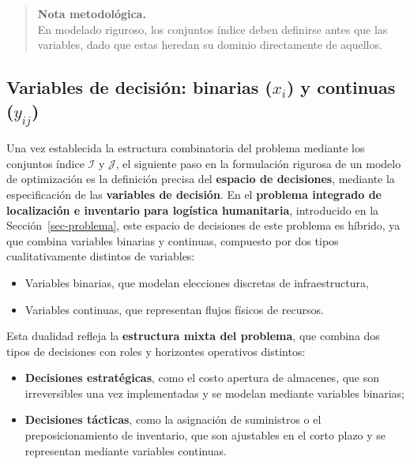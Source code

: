 \documentclass[
  spanish,
  us-letterpaper,
]{scrreprt}
\providecommand{\tightlist}{%
  \setlength{\itemsep}{0pt}\setlength{\parskip}{0pt}}
\numberwithin{equation}{section}
\begin{document}
\begin{quote}
\textbf{Nota metodológica.}\\
En modelado riguroso, los conjuntos índice deben definirse antes que las
variables, dado que estas heredan su dominio directamente de aquellos.
\end{quote}

\subsection{\texorpdfstring{Variables de decisión: binarias (\(x_i\)) y
continuas
(\(y_{ij}\))}{Variables de decisión: binarias (x\_i) y continuas (y\_\{ij\})}}\label{variables-de-decisiuxf3n-binarias-x_i-y-continuas-y_ij}

Una vez establecida la estructura combinatoria del problema mediante los
conjuntos índice \(\mathcal{I}\) y \(\mathcal{J}\), el siguiente paso en
la formulación rigurosa de un modelo de optimización es la definición
precisa del \textbf{espacio de decisiones}, mediante la especificación
de las \textbf{variables de decisión}. En el \textbf{problema integrado
de localización e inventario para logística humanitaria}, introducido en
la Sección~\ref{sec-problema}, este espacio de decisiones de este
problema es híbrido, ya que combina variables binarias y continuas,
compuesto por dos tipos cualitativamente distintos de variables:

\begin{itemize}
\tightlist
\item
  Variables binarias, que modelan elecciones discretas de
  infraestructura,
\item
  Variables continuas, que representan flujos físicos de recursos.
\end{itemize}

Esta dualidad refleja la \textbf{estructura mixta del problema}, que
combina dos tipos de decisiones con roles y horizontes operativos
distintos:

\begin{itemize}
\tightlist
\item
  \textbf{Decisiones estratégicas}, como el costo apertura de almacenes,
  que son irreversibles una vez implementadas y se modelan mediante
  variables binarias;
\item
  \textbf{Decisiones tácticas}, como la asignación de suministros o el
  preposicionamiento de inventario, que son ajustables en el corto plazo
  y se representan mediante variables continuas.
\end{itemize}
\end{document}
